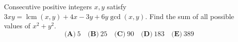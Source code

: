 Consecutive positive integers $x,y$ satisfy $3xy=\operatorname{lcm}(x,y)+4x-3y+6y\gcd(x,y)$. Find the sum of all possible values of $x^2+y^2$.
\[\textbf{(A)}~5\quad\textbf{(B)}~25\quad\textbf{(C)}~90\quad\textbf{(D)}~183\quad\textbf{(E)}~389\]
